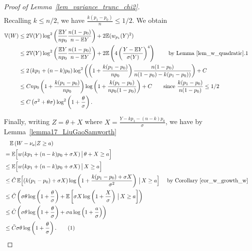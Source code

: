 \documentclass{article}
\newcommand\numberthis{\addtocounter{equation}{1}\tag{\theequation}}
\begin{document}
\begin{proof}[Proof of Lemma~\ref{lem_variance_trunc_chi2}]
\begin{align*}
\end{align*}
Recalling $k \leq n/2$, we have $\frac{k(p_1-p_0)}{n} \leq 1/2$. We obtain
\begin{align*}
    \mathbb V(W) &\leq 2\mathbb V(Y) \log^2\left(\frac{\mathbb EY}{np_0}\frac{n(1-p_0)}{n-\mathbb EY}\right) + 2 \mathbb E (w_{p_1}(Y)^2) \\
    & \leq 2\mathbb V(Y) \log^2\left(\frac{\mathbb EY}{np_0}\frac{n(1-p_0)}{n-\mathbb EY}\right) + 2 \mathbb E \left(4\left(\frac{Y-\mathbb EY}{\sigma(Y)}\right)^4\right) \qquad \text{ by Lemma~\ref{lem_w_quadratic}.1}\\
    & \leq 2\left(kp_1 + (n-k) p_0\right) \log^2 \left(\left(1 + \frac{k(p_1 - p_0)}{np_0}\right)\frac{n(1-p_0)}{n(1-p_0) - k(p_1-p_0))}\right) + C\\
    & \leq C np_0\left(1+\frac{k(p_1-p_0)}{np_0}\right) \log\left(1+\frac{k(p_1-p_0)}{np_0(1-p_0)}\right) + C \qquad \text{since } \frac{k(p_1-p_0)}{n(1-p_0)} \leq 1/2\\
    & \leq C\left(\sigma^2 + \theta \sigma\right) \log^2\left(1+\frac{\theta}{\sigma}\right).
\end{align*}


Finally, writing $Z=\theta+X$ where $X = \frac{Y-kp_1 - (n-k)p_0}{\sigma}$, we have by Lemma~\ref{lemma17_LiuGaoSamworth}
\begin{align*}
& \quad \mathbb{E}\left(W-\nu_{a}| Z \geq a\right) \\
& = \mathbb E \Big[w(kp_1 + (n-k)p_0 + \sigma X) \, \big| \, \theta + X \geq a\Big]\\
& \leq \mathbb E \Big[w(kp_1 + (n-k)p_0 + \sigma X) \, \big| \, X \geq a \Big]\\
& \leq \tilde C \, \mathbb E \Big[(k(p_1-p_0) + \sigma X) \log\left(1+ \frac{k(p_1-p_0) + \sigma X}{\sigma^2}\right) \, \big| \, X \geq a \Big] \quad \text{ by Corollary~\ref{cor_w_growth_w}}\\
& \leq \tilde C \left(\sigma \theta \log\left(1+ \frac{\theta}{\sigma}\right) + \mathbb E \left[\sigma X \log\left(1+ \frac{X}{\sigma}\right) \, \big| \, X \geq a \right]\right)\\
& \leq \tilde C \left(\sigma \theta \log\left(1+ \frac{\theta}{\sigma}\right) + \sigma a \log\left(1+ \frac{a}{\sigma}\right)\right)\\
& \leq \tilde C  \sigma  \theta\log\left(1+ \frac{\theta}{\sigma}\right). \numberthis\label{eq_seconn_part_variance_H1}
\end{align*}



\end{proof}
\end{document}
